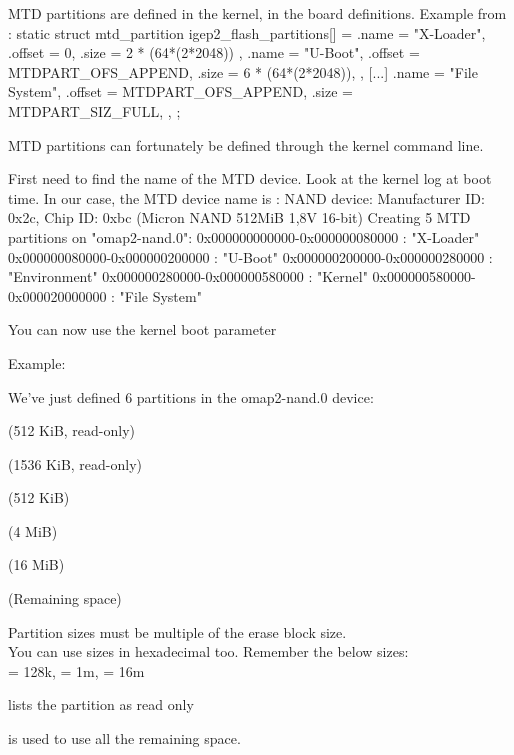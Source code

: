   MTD partitions are defined in the kernel, in the board
  definitions. Example from
  :
\starttyping
static struct mtd_partition igep2_flash_partitions[] = {
    {
        .name   = "X-Loader",
        .offset = 0,
        .size   = 2 * (64*(2*2048))
    },
    {
        .name   = "U-Boot",
        .offset = MTDPART_OFS_APPEND,
        .size   = 6 * (64*(2*2048)),
    },
    [...]
    {
        .name   = "File System",
        .offset = MTDPART_OFS_APPEND,
        .size   = MTDPART_SIZ_FULL,
    },
};
\stoptyping

  \startitemize
  \item MTD partitions can fortunately be defined through the kernel
    command line.
  \item First need to find the name of the MTD device. Look at the
    kernel log at boot time. In our case, the MTD device name is
    :
\stopitemize
\starttyping
NAND device: Manufacturer ID: 0x2c, Chip ID: 0xbc (Micron NAND 512MiB 1,8V 16-bit)
Creating 5 MTD partitions on "omap2-nand.0":
0x000000000000-0x000000080000 : "X-Loader"
0x000000080000-0x000000200000 : "U-Boot"
0x000000200000-0x000000280000 : "Environment"
0x000000280000-0x000000580000 : "Kernel"
0x000000580000-0x000020000000 : "File System"
\stoptyping

  \startitemize
  \item You can now use the  kernel boot parameter
  \item Example:\\
  \item We've just defined 6 partitions in the omap2-nand.0 device:
    \startitemize
    \item {} (512 KiB, read-only)
    \item {} (1536 KiB, read-only)
    \item {} (512 KiB)
    \item {} (4 MiB)
    \item {} (16 MiB)
    \item {} (Remaining space)
    \stopitemize
  \stopitemize

  \startitemize
  \item Partition sizes must be multiple of the erase block size.\\
    You can use sizes in hexadecimal too. Remember the below sizes:\\
     = 128k,  = 1m,  = 16m
  \item {} lists the partition as read only
  \item \type{-} is used to use all the remaining space.
  \stopitemize

